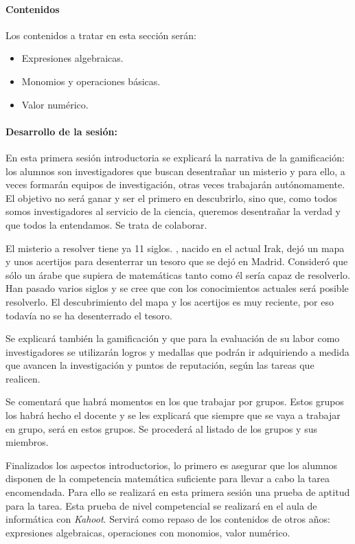 \paragraph{Contenidos}

Los contenidos a tratar en esta sección serán:

\begin{itemize}
\item Expresiones algebraicas.
\item Monomios y operaciones básicas.
\item Valor numérico.
\end{itemize}

\paragraph{Desarrollo de la sesión: }

En esta primera sesión introductoria se explicará la narrativa de la gamificación: 
%
los alumnos son investigadores que buscan desentrañar un misterio y para ello, a veces formarán equipos de investigación, otras veces trabajarán autónomamente.
%
El objetivo no será ganar y ser el primero en descubrirlo, sino que, como todos somos investigadores al servicio de la ciencia, queremos desentrañar la verdad y que todos la entendamos.
%
Se trata de colaborar.

El misterio a resolver tiene ya 11 siglos.
%
\Arab, nacido en el actual Irak, dejó un mapa y unos acertijos para desenterrar un tesoro que se dejó en Madrid.
%
Consideró que sólo un árabe que supiera de matemáticas tanto como él sería capaz de resolverlo.
%
Han pasado varios siglos y se cree que con los conocimientos actuales será posible resolverlo.
%
El descubrimiento del mapa y los acertijos es muy reciente, por eso todavía no se ha desenterrado el tesoro.

Se explicará también la gamificación y que para la evaluación de su labor como investigadores se utilizarán logros y medallas que podrán ir adquiriendo a medida que avancen la investigación y puntos de reputación, según las tareas que realicen.

Se comentará que habrá momentos en los que trabajar por grupos.
%
Estos grupos los habrá hecho el docente  y se les explicará que siempre que se vaya a trabajar en grupo, será en estos grupos.
%
Se procederá al listado de los grupos y sus miembros.

Finalizados los aspectos introductorios, lo primero es asegurar que los alumnos disponen de la competencia matemática suficiente para llevar a cabo la tarea encomendada.
%
Para ello se realizará en esta primera sesión una prueba de aptitud para la tarea.
%
Esta prueba de nivel competencial se realizará en el aula de informática con \textit{Kahoot}.
%
Servirá como repaso de los contenidos de otros años: expresiones algebraicas, operaciones con monomios, valor numérico.

